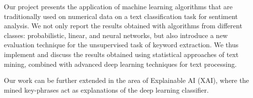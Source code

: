 Our project presents the application of machine learning algorithms that are traditionally used on numerical data on a text classification task for sentiment analysis.
We not only report the results obtained with algorithms from different classes: probabilistic, linear, and neural networks, but also introduce a new evaluation technique for the unsupervised task of keyword extraction. We thus implement and discuss the results obtained using statistical approaches of text mining, combined with advanced deep learning techniques for text processing.

Our work can be further extended in the area of Explainable AI (XAI), where the mined key-phrases act as explanations of the deep learning classifier.